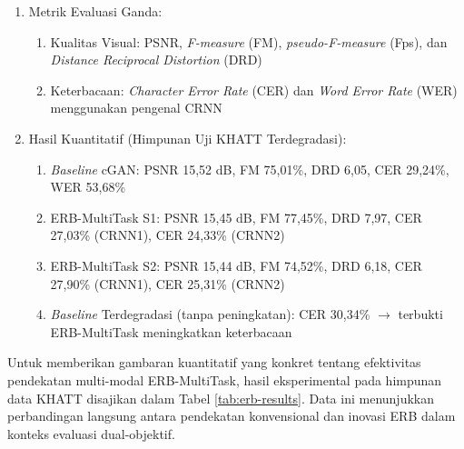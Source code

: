 \documentclass[12pt,a4paper]{article}
\begin{document}
\begin{enumerate}[leftmargin=*, labelindent=0pt, itemsep=1ex, topsep=0pt]
\begin{enumerate}[leftmargin=1.5em, labelsep=0.5em, itemindent=0pt, label=\arabic*., topsep=0pt, parsep=0pt, itemsep=0.5em]
      \item Metrik Evaluasi Ganda:
            \begin{enumerate}[leftmargin=1.5em, labelsep=0.5em, itemindent=0pt, noitemsep, topsep=0pt, label=\alph*.]
                  \item Kualitas Visual: PSNR, \textit{F-measure} (FM), \textit{pseudo-F-measure} (Fps), dan \textit{Distance Reciprocal Distortion} (DRD)
                  \item Keterbacaan: \textit{Character Error Rate} (CER) dan \textit{Word Error Rate} (WER) menggunakan pengenal CRNN
            \end{enumerate}

      \item Hasil Kuantitatif (Himpunan Uji KHATT Terdegradasi):
            \begin{enumerate}[leftmargin=1.5em, labelsep=0.5em, itemindent=0pt, noitemsep, topsep=0pt, label=\alph*.]
                  \item \textit{Baseline} cGAN: PSNR 15,52 dB, FM 75,01\%, DRD 6,05, CER 29,24\%, WER 53,68\%
                  \item ERB-MultiTask S1: PSNR 15,45 dB, FM 77,45\%, DRD 7,97, CER 27,03\% (CRNN1), CER 24,33\% (CRNN2)
                  \item ERB-MultiTask S2: PSNR 15,44 dB, FM 74,52\%, DRD 6,18, CER 27,90\% (CRNN1), CER 25,31\% (CRNN2)
                  \item \textit{Baseline} Terdegradasi (tanpa peningkatan): CER 30,34\% $\to$ terbukti ERB-MultiTask meningkatkan keterbacaan
            \end{enumerate}
\end{enumerate}

Untuk memberikan gambaran kuantitatif yang konkret tentang efektivitas pendekatan multi-modal ERB-MultiTask, hasil eksperimental pada himpunan data KHATT disajikan dalam Tabel \ref{tab:erb-results}. Data ini menunjukkan perbandingan langsung antara pendekatan konvensional dan inovasi ERB dalam konteks evaluasi dual-objektif.


\end{enumerate}
\end{document}
